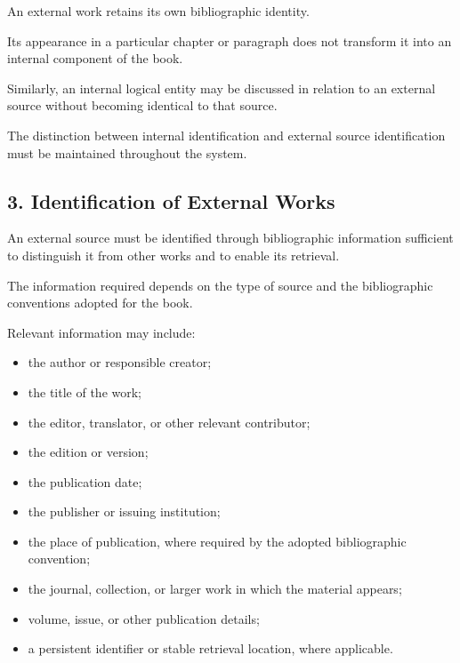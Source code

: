 An external work retains its own
bibliographic identity.

Its appearance in a particular
chapter or paragraph does not
transform it into an internal
component of the book.

Similarly, an internal logical
entity may be discussed in relation
to an external source without
becoming identical to that source.

The distinction between internal
identification and external source
identification must be maintained
throughout the system.


\subsection*{3. Identification of External Works}

An external source must be identified
through bibliographic information
sufficient to distinguish it from
other works and to enable its
retrieval.

The information required depends
on the type of source and the
bibliographic conventions adopted
for the book.

Relevant information may include:

\begin{itemize}
    \item the author or responsible
    creator;
    \item the title of the work;
    \item the editor, translator,
    or other relevant contributor;
    \item the edition or version;
    \item the publication date;
    \item the publisher or issuing
    institution;
    \item the place of publication,
    where required by the adopted
    bibliographic convention;
    \item the journal, collection,
    or larger work in which the
    material appears;
    \item volume, issue, or other
    publication details;
    \item a persistent identifier
    or stable retrieval location,
    where applicable.
\end{itemize}

